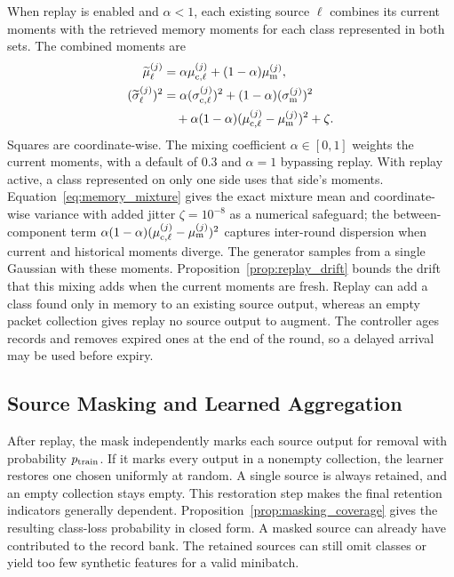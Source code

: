 When replay is enabled and $\alpha<1$, each existing source $\ell$ combines its current moments with the retrieved memory moments for each class represented in both sets. The combined moments are
\begin{equation}
\begin{split}
 \widetilde{\mu}_{\ell}^{(j)}
 &=\alpha\mu_{\mathrm c,\ell}^{(j)}
 +(1-\alpha)\mu_{\mathrm m}^{(j)},\\
 (\widetilde{\sigma}_{\ell}^{(j)})^2
 &=\alpha(\sigma_{\mathrm c,\ell}^{(j)})^2
 +(1-\alpha)(\sigma_{\mathrm m}^{(j)})^2\\
 &\quad+\alpha(1-\alpha)
 (\mu_{\mathrm c,\ell}^{(j)}-\mu_{\mathrm m}^{(j)})^2+\zeta .
\end{split}
\label{eq:memory_mixture}
\end{equation}
Squares are coordinate-wise. The mixing coefficient $\alpha\in[0,1]$ weights the current moments, with a default of $0.3$ and $\alpha=1$ bypassing replay. With replay active, a class represented on only one side uses that side's moments. Equation~\eqref{eq:memory_mixture} gives the exact mixture mean and coordinate-wise variance with added jitter $\zeta=10^{-8}$ as a numerical safeguard; the between-component term $\alpha(1-\alpha)(\mu_{\mathrm c,\ell}^{(j)}-\mu_{\mathrm m}^{(j)})^2$ captures inter-round dispersion when current and historical moments diverge. The generator samples from a single Gaussian with these moments. Proposition~\ref{prop:replay_drift} bounds the drift that this mixing adds when the current moments are fresh. Replay can add a class found only in memory to an existing source output, whereas an empty packet collection gives replay no source output to augment. The controller ages records and removes expired ones at the end of the round, so a delayed arrival may be used before expiry.

\subsection{Source Masking and Learned Aggregation}
\label{sec:reliability}
\label{sec:dropout}

After replay, the mask independently marks each source output for removal with probability $p_{\mathrm{train}}$. If it marks every output in a nonempty collection, the learner restores one chosen uniformly at random. A single source is always retained, and an empty collection stays empty. This restoration step makes the final retention indicators generally dependent. Proposition~\ref{prop:masking_coverage} gives the resulting class-loss probability in closed form. A masked source can already have contributed to the record bank. The retained sources can still omit classes or yield too few synthetic features for a valid minibatch.

